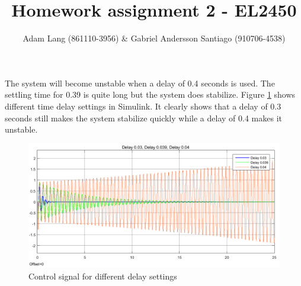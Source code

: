 \documentclass[12pt,a4paper]{article}
\title{Homework assignment 2 - EL2450}
\author{Adam Lang (861110-3956) \& Gabriel Andersson Santiago
(910706-4538)}
\begin{document}
\subsection{}
The system will become unstable when a delay of 0.4 seconds is used. The settling time for 0.39 is quite long but the system does stabilize. Figure \ref{fig:network_delay} shows different time delay settings in Simulink. It clearly shows that a delay of 0.3 seconds still makes the system stabilize quickly while a delay of 0.4 makes it unstable.

\begin{center}
      \begin{figure}[H]
      \centering
        \includegraphics[scale=0.5]{network_delay.png}
        
      \caption{Control signal for different delay settings}
      \label{fig:network_delay}
      
      \end{figure}
    \end{center}
    
\end{document}
